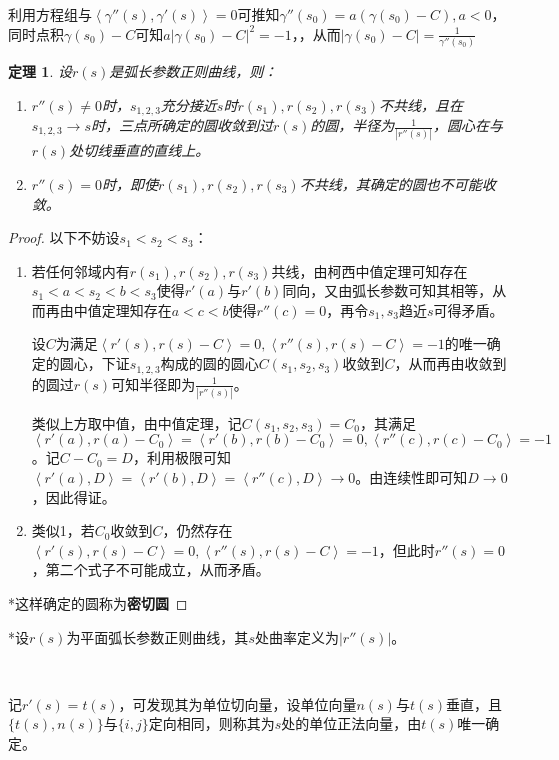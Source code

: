 \documentclass[a4paper,UTF8,fontset=windows]{ctexart}
\newtheorem{thm}{定理}[section]
\begin{document}
利用方程组与$\left<\gamma''(s),\gamma'(s)\right>=0$可推知$\gamma''(s_0)=a(\gamma(s_0)-C),a<0$，同时点积$\gamma(s_0)-C$可知$a|\gamma(s_0)-C|^2=-1$，，从而$|\gamma(s_0)-C|=\frac{1}{\gamma''(s_0)}$

\begin{thm}
设$r(s)$是弧长参数正则曲线，则：
\begin{enumerate}
    \item $r''(s)\ne0$时，$s_{1,2,3}$充分接近$s$时$r(s_1),r(s_2),r(s_3)$不共线，且在$s_{1,2,3}\to s$时，三点所确定的圆收敛到过$r(s)$的圆，半径为$\frac{1}{|r''(s)|}$，圆心在与$r(s)$处切线垂直的直线上。
    \item $r''(s)=0$时，即使$r(s_1),r(s_2),r(s_3)$不共线，其确定的圆也不可能收敛。
\end{enumerate}
\end{thm}

\begin{proof}
以下不妨设$s_1<s_2<s_3$：
\begin{enumerate}
\item
若任何邻域内有$r(s_1),r(s_2),r(s_3)$共线，由柯西中值定理可知存在$s_1<a<s_2<b<s_3$使得$r'(a)$与$r'(b)$同向，又由弧长参数可知其相等，从而再由中值定理知存在$a<c<b$使得$r''(c)=0$，再令$s_1,s_3$趋近$s$可得矛盾。

设$C$为满足$\left<r'(s),r(s)-C\right>=0,\left<r''(s),r(s)-C\right>=-1$的唯一确定的圆心，下证$s_{1,2,3}$构成的圆的圆心$C(s_1,s_2,s_3)$收敛到$C$，从而再由收敛到的圆过$r(s)$可知半径即为$\frac{1}{|r''(s)|}$。

类似上方取中值，由中值定理，记$C(s_1,s_2,s_3)=C_0$，其满足$\left<r'(a),r(a)-C_0\right>=\left<r'(b),r(b)-C_0\right>=0,\left<r''(c),r(c)-C_0\right>=-1$。记$C-C_0=D$，利用极限可知$\left<r'(a),D\right>=\left<r'(b),D\right>=\left<r''(c),D\right>\to 0$。由连续性即可知$D\to0$，因此得证。

\item
类似1，若$C_0$收敛到$C$，仍然存在$\left<r'(s),r(s)-C\right>=0,\left<r''(s),r(s)-C\right>=-1$，但此时$r''(s)=0$，第二个式子不可能成立，从而矛盾。
\end{enumerate}

*这样确定的圆称为\textbf{密切圆}
\end{proof}

*设$r(s)$为平面弧长参数正则曲线，其$s$处曲率定义为$|r''(s)|$。

\

记$r'(s)=t(s)$，可发现其为单位切向量，设单位向量$n(s)$与$t(s)$垂直，且$\{t(s),n(s)\}$与$\{i,j\}$定向相同，则称其为$s$处的单位正法向量，由$t(s)$唯一确定。
\end{document}
